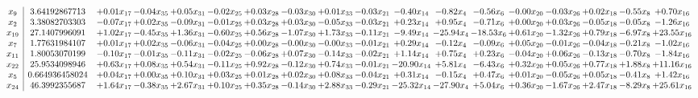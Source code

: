 \documentclass[9pt]{article}
\begin{document}
 \[\begin{array}{c| c c@{\hskip 2pt} c@{\hskip 2pt} c@{\hskip 2pt} c@{\hskip 2pt} c@{\hskip 2pt} c@{\hskip 2pt} c@{\hskip 2pt} c@{\hskip 2pt} c@{\hskip 2pt} c@{\hskip 2pt} c@{\hskip 2pt} c@{\hskip 2pt} c@{\hskip 2pt} c@{\hskip 2pt} c@{\hskip 2pt} c@{\hskip 2pt} }
 x_{9}   &  3.64192867713 & +  0.01 x_{17} & -0.04 x_{35} & +  0.05 x_{31} & -0.02 x_{25} & +  0.03 x_{28} & -0.03 x_{30} & +  0.01 x_{33} & -0.03 x_{21} & -0.40 x_{14} & -0.82 x_{4} & -0.56 x_{6} & -0.00 x_{20} & -0.03 x_{26} & +  0.02 x_{18} & -0.55 x_{8} & +  0.70 x_{16}\\
 x_{2}   &  3.38082703303 & -0.07 x_{17} & +  0.02 x_{35} & -0.09 x_{31} & -0.01 x_{25} & +  0.03 x_{28} & +  0.03 x_{30} & -0.05 x_{33} & -0.03 x_{21} & +  0.23 x_{14} & +  0.95 x_{4} & -0.71 x_{6} & +  0.00 x_{20} & +  0.03 x_{26} & -0.05 x_{18} & -0.05 x_{8} & -1.26 x_{16}\\
 x_{19}   &  27.1407996091 & +  1.02 x_{17} & -0.45 x_{35} & +  1.36 x_{31} & -0.60 x_{25} & +  0.56 x_{28} & -1.07 x_{30} & +  1.73 x_{33} & -0.11 x_{21} & -9.49 x_{14} & -25.94 x_{4} & -18.53 x_{6} & +  0.61 x_{20} & -1.32 x_{26} & +  0.79 x_{18} & -6.97 x_{8} & + 23.55 x_{16}\\
 x_{7}   &  1.77631984107 & +  0.01 x_{17} & +  0.02 x_{35} & -0.06 x_{31} & -0.04 x_{25} & +  0.00 x_{28} & -0.00 x_{30} & -0.00 x_{33} & -0.01 x_{21} & +  0.29 x_{14} & -0.12 x_{4} & -0.09 x_{6} & +  0.05 x_{20} & -0.01 x_{26} & -0.04 x_{18} & -0.21 x_{8} & -1.02 x_{16}\\
 x_{11}   &  1.80053070199 & -0.10 x_{17} & -0.01 x_{35} & -0.11 x_{31} & -0.02 x_{25} & -0.06 x_{28} & +  0.07 x_{30} & -0.14 x_{33} & -0.02 x_{21} & +  1.14 x_{14} & +  0.75 x_{4} & +  0.23 x_{6} & -0.04 x_{20} & +  0.06 x_{26} & -0.13 x_{18} & -0.70 x_{8} & -1.84 x_{16}\\
 x_{22}   &  25.9534098946 & +  0.63 x_{17} & +  0.08 x_{35} & +  0.54 x_{31} & -0.11 x_{25} & +  0.92 x_{28} & -0.12 x_{30} & +  0.74 x_{33} & -0.01 x_{21} & -20.90 x_{14} & +  5.81 x_{4} & -6.43 x_{6} & +  0.32 x_{20} & +  0.05 x_{26} & +  0.77 x_{18} & +  1.88 x_{8} & + 11.16 x_{16}\\
 x_{5}   &  0.664936458024 & +  0.04 x_{17} & +  0.00 x_{35} & +  0.10 x_{31} & +  0.03 x_{25} & +  0.01 x_{28} & +  0.02 x_{30} & +  0.08 x_{33} & -0.04 x_{21} & +  0.31 x_{14} & -0.15 x_{4} & +  0.47 x_{6} & +  0.01 x_{20} & -0.05 x_{26} & +  0.05 x_{18} & -0.41 x_{8} & +  1.42 x_{16}\\
 x_{24}   &  46.3992355687 & +  1.64 x_{17} & -0.38 x_{35} & +  2.67 x_{31} & +  0.10 x_{25} & +  0.35 x_{28} & -0.14 x_{30} & +  2.88 x_{33} & -0.29 x_{21} & -25.32 x_{14} & -27.90 x_{4} & +  5.04 x_{6} & +  0.36 x_{20} & -1.67 x_{26} & +  2.47 x_{18} & -8.29 x_{8} & + 25.61 x_{16}\\

\end{array}\]
\end{document}
